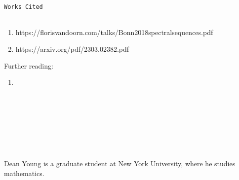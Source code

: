 \documentclass{book}
\theoremstyle{definition}
\newcounter{lcounter}
\begin{document}
\newpage
{
\Huge 
\begin{center}
\ \\
\ \\
\texttt{Works Cited}
\ \\
\ \\
\end{center}
\thispagestyle{empty}
}



\begin{enumerate}
\item https://florisvandoorn.com/talks/Bonn2018spectralsequences.pdf
\item https://arxiv.org/pdf/2303.02382.pdf
\end{enumerate}

Further reading:

\begin{enumerate}
\item 
\end{enumerate}



\newpage 
\ \\
\ \\
\ \\
\ \\
\ \\
\ \\
\begin{center}
\begin{tcolorbox}[width=5in,colback={white},title={\begin{center}\texttt{About the Author} \addtocounter{lcounter}{1}  \end{center}},colbacktitle=Yellow,coltitle=black]
Dean Young is a graduate student at New York University, where he studies mathematics. \\

\begin{center}

\end{center}
\end{tcolorbox}
\end{center}
\newpage
\ \\
\thispagestyle{empty}
\pagecolor{Yellow}
\fi
\end{document}

